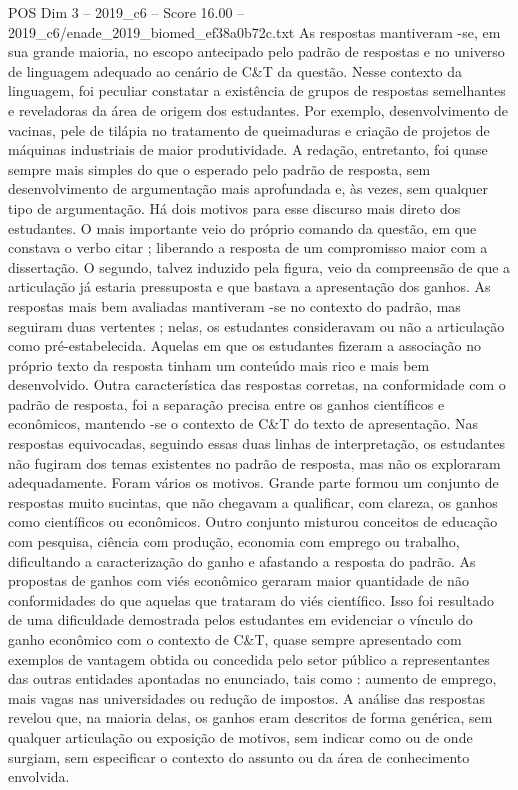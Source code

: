\begin{textsample}{POS Dim 3 – 2019\_c6 – Score 16.00 – 2019\_c6/enade\_2019\_biomed\_ef38a0b72c.txt}
As respostas mantiveram -se, em sua grande maioria, no escopo antecipado pelo padrão de respostas e no universo de linguagem adequado ao cenário de C\&T da questão.
Nesse contexto da linguagem, foi peculiar constatar a existência de grupos de respostas semelhantes e reveladoras da área de origem dos estudantes.
Por exemplo, desenvolvimento de vacinas, pele de tilápia no tratamento de queimaduras e criação de projetos de máquinas industriais de maior produtividade.
A redação, entretanto, foi quase sempre mais simples do que o esperado pelo padrão de resposta, sem desenvolvimento de argumentação mais aprofundada e, às vezes, sem qualquer tipo de argumentação.
Há dois motivos para esse discurso mais direto dos estudantes.
O mais importante veio do próprio comando da questão, em que constava o verbo citar ; liberando a resposta de um compromisso maior com a dissertação.
O segundo, talvez induzido pela figura, veio da compreensão de que a articulação já estaria pressuposta e que bastava a apresentação dos ganhos.
As respostas mais bem avaliadas mantiveram -se no contexto do padrão, mas seguiram duas vertentes ; nelas, os estudantes consideravam ou não a articulação como pré-estabelecida.
Aquelas em que os estudantes fizeram a associação no próprio texto da resposta tinham um conteúdo mais rico e mais bem desenvolvido.
Outra característica das respostas corretas, na conformidade com o padrão de resposta, foi a separação precisa entre os ganhos científicos e econômicos, mantendo -se o contexto de C\&T do texto de apresentação.
Nas respostas equivocadas, seguindo essas duas linhas de interpretação, os estudantes não fugiram dos temas existentes no padrão de resposta, mas não os exploraram adequadamente.
Foram vários os motivos.
Grande parte formou um conjunto de respostas muito sucintas, que não chegavam a qualificar, com clareza, os ganhos como científicos ou econômicos.
Outro conjunto misturou conceitos de educação com pesquisa, ciência com produção, economia com emprego ou trabalho, dificultando a caracterização do ganho e afastando a resposta do padrão.
As propostas de ganhos com viés econômico geraram maior quantidade de não conformidades do que aquelas que trataram do viés científico.
Isso foi resultado de uma dificuldade demostrada pelos estudantes em evidenciar o vínculo do ganho econômico com o contexto de C\&T, quase sempre apresentado com exemplos de vantagem obtida ou concedida pelo setor público a representantes das outras entidades apontadas no enunciado, tais como : aumento de emprego, mais vagas nas universidades ou redução de impostos.
A análise das respostas revelou que, na maioria delas, os ganhos eram descritos de forma genérica, sem qualquer articulação ou exposição de motivos, sem indicar como ou de onde surgiam, sem especificar o contexto do assunto ou da área de conhecimento envolvida.

\end{textsample}
